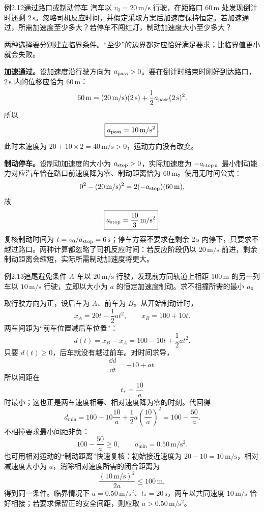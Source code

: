 \begin{origexamplebox}{例2.12\quad 通过路口或制动停车}
汽车以 $v_0=20\,\mathrm{m/s}$ 行驶，在距路口 $60\,\mathrm m$ 处发现倒计时还剩 $2\,\mathrm s$。忽略司机反应时间，并假定采取方案后加速度保持恒定。若加速通过，所需加速度至少多大？若停车不闯红灯，制动加速度大小至少多大？
\end{origexamplebox}
\begin{xesolution}
两种选择要分别建立临界条件。“至少”的边界都对应恰好满足要求；比临界值更小就会失败。

\textbf{加速通过。}设加速度沿行驶方向为 $a_{\rm pass}>0$。要在倒计时结束时刚好到达路口，$2\,\mathrm s$ 内的位移应恰为 $60\,\mathrm m$：
\[
60\,\mathrm m=(20\,\mathrm{m/s})(2\,\mathrm s)
+\frac12a_{\rm pass}(2\,\mathrm s)^2.
\]
所以
\[
\boxed{a_{\rm pass}=10\,\mathrm{m/s^2}}.
\]
此时末速度为 $20+10\times2=40\,\mathrm{m/s}>0$，运动方向没有改变。

\textbf{制动停车。}设制动加速度的大小为 $a_{\rm stop}>0$，实际加速度为 $-a_{\rm stop}$。最小制动能力对应汽车恰在路口前速度降为零、制动距离恰为 $60\,\mathrm m$。使用无时间公式：
\[
0^2-(20\,\mathrm{m/s})^2
=2(-a_{\rm stop})(60\,\mathrm m),
\]
故
\[
\boxed{a_{\rm stop}=\frac{10}{3}\,\mathrm{m/s^2}}.
\]
复核制动时间为 $t=v_0/a_{\rm stop}=6\,\mathrm s$；停车方案不要求在剩余 $2\,\mathrm s$ 内停下，只要求不越过路口。两种计算都忽略了司机反应时间：若反应阶段仍以 $20\,\mathrm{m/s}$ 前进，剩余制动距离会缩短，实际所需制动加速度将更大。
\end{xesolution}

\begin{origexamplebox}{例2.13\quad 追尾避免条件}
$A$ 车以 $20\,\mathrm{m/s}$ 行驶，发现前方同轨道上相距 $100\,\mathrm m$ 的另一列车以 $10\,\mathrm{m/s}$ 行驶，立即以大小为 $a$ 的恒定加速度制动。求不相撞所需的最小 $a$。
\end{origexamplebox}
\begin{xesolution}
取行驶方向为正，设后车为 $A$、前车为 $B$。从开始制动计时，
\[
x_A=20t-\frac12at^2,
\qquad
x_B=100+10t.
\]
两车间距为“前车位置减后车位置”：
\[
d(t)=x_B-x_A=100-10t+\frac12at^2.
\]
只要 $d(t)\ge0$，后车就没有越过前车。对时间求导，
\[
\frac{\dd d}{\dd t}=-10+at.
\]
所以间距在
\[
t_*=\frac{10}{a}
\]
时最小；这也正是两车速度相等、相对速度降为零的时刻。代回得
\[
d_{\min}=100-10\frac{10}{a}
+\frac12a\left(\frac{10}{a}\right)^2
=100-\frac{50}{a}.
\]
不相撞要求最小间距非负：
\[
100-\frac{50}{a}\ge0,\qquad \boxed{a_{\min}=0.50\,\mathrm{m/s^2}}.
\]
也可用相对运动的“制动距离”快速复核：初始接近速度为
$20-10=10\,\mathrm{m/s}$，相对减速度大小为 $a$，消除相对速度所需的闭合距离为
\[
\frac{(10\,\mathrm{m/s})^2}{2a}\le100\,\mathrm m,
\]
得到同一条件。临界情况下 $a=0.50\,\mathrm{m/s^2}$、$t_*=20\,\mathrm s$，两车以共同速度 $10\,\mathrm{m/s}$ 恰好相接；若要求保留正的安全间距，则应取 $a>0.50\,\mathrm{m/s^2}$。
\end{xesolution}

